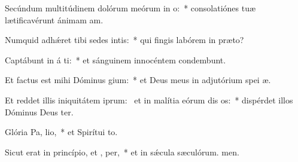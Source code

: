 \item Secúndum multitúdinem dolórum meórum in  o:~* consolatiónes tuæ lætificavérunt ánimam am.
\item Numquid adhǽret tibi sedes intis:~* qui fingis labórem in præto?
\item Captábunt in á ti:~* et sánguinem innocéntem condembunt.
\item Et factus est mihi Dóminus  gium:~* et Deus meus in adjutórium spei æ.
\item Et reddet illis iniquitátem iprum:~\pscross{} et in malítia eórum dis os:~* dispérdet illos Dóminus Deus ter.
\item Glória Pa,  lio,~* et Spirítui to.
\item Sicut erat in princípio, et ,  per,~* et in sǽcula sæculórum. men.
